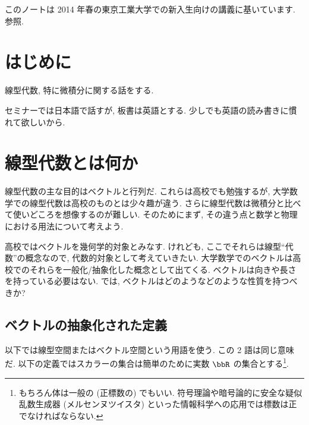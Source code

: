 \documentclass[openany, a4paper, oneside]{jsbook}
\begin{document}
このノートは 2014 年春の東京工業大学での新入生向けの講義に基いています.
\cite{MasahikoSaitoh1, AsaoArai3, AraiEzawa1, AraiEzawa2, KenjiFukaya2, ToshioNiwa1} 参照.
\section{はじめに}

線型代数, 特に微積分に関する話をする.

セミナーでは日本語で話すが, 板書は英語とする.
少しでも英語の読み書きに慣れて欲しいから.
\section{線型代数とは何か}

線型代数の主な目的はベクトルと行列だ.
これらは高校でも勉強するが,
大学数学での線型代数は高校のものとは少々趣が違う.
さらに線型代数は微積分と比べて使いどころを想像するのが難しい.
そのためにまず, その違う点と数学と物理における用法について考えよう.

高校ではベクトルを幾何学的対象とみなす.
けれども, ここでそれらは線型``代数''の概念なので,
代数的対象として考えていきたい.
大学数学でのベクトルは高校でのそれらを一般化/抽象化した概念として出てくる.
ベクトルは向きや長さを持っている必要はない.
では, ベクトルはどのようなどのような性質を持つべきか?
\subsection{ベクトルの抽象化された定義}

以下では線型空間またはベクトル空間という用語を使う.
この 2 語は同じ意味だ.
以下の定義ではスカラーの集合は簡単のために実数 $\bbR$ の集合とする\footnote{もちろん体は一般の (正標数の) でもいい.
符号理論や暗号論的に安全な疑似乱数生成器 (メルセンヌツイスタ) といった情報科学への応用では標数は正でなければならない.}.
\end{document}
